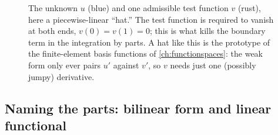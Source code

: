 \begin{figure}[t]
\centering
{}
\caption[A test function against the unknown]{The unknown $u$ (blue) and one
admissible test function $v$ (rust), here a piecewise-linear ``hat.'' The test
function is required to vanish at both ends, $v(0)=v(1)=0$; this is what kills
the boundary term in the integration by parts. A hat like this is the prototype
of the finite-element basis functions of \cref{ch:functionspaces}: the weak form
only ever pairs $u'$ against $v'$, so $v$ needs just one (possibly jumpy)
derivative.}
\label{fig:hat}
\end{figure}

\subsection{Naming the parts: bilinear form and linear functional}

